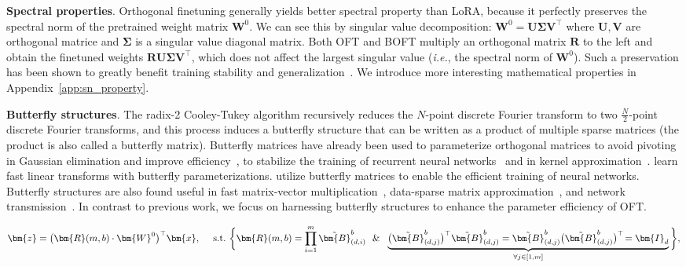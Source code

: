 \textbf{Spectral properties}. Orthogonal finetuning generally yields better spectral property than LoRA, because it perfectly preserves the spectral norm of the pretrained weight matrix $\bm{W}^0$. We can see this by singular value decomposition: $\bm{W}^0=\bm{U}\bm{\Sigma}\bm{V}^\top$ where $\bm{U},\bm{V}$ are orthogonal matrice and $\bm{\Sigma}$ is a singular value diagonal matrix. Both OFT and BOFT multiply an orthogonal matrix $\bm{R}$ to the left and obtain the finetuned weights $\bm{R}\bm{U}\bm{\Sigma}\bm{V}^\top$, which does not affect the largest singular value (\emph{i.e.}, the spectral norm of $\bm{W}^0$). Such a preservation has been shown to greatly benefit training stability and generalization~\cite{miyato2018spectral,yoshida2017spectral}. We introduce more interesting mathematical properties in Appendix~\ref{app:sn_property}.

\textbf{Butterfly structures}. The radix-2 Cooley-Tukey algorithm recursively reduces the $N$-point discrete Fourier transform to two $\frac{N}{2}$-point discrete Fourier transforms, and this process induces a butterfly structure that can be written as a product of multiple sparse matrices (the product is also called a butterfly matrix). Butterfly matrices have already been used to parameterize  orthogonal matrices to avoid pivoting in Gaussian elimination and improve efficiency~\cite{parker1995random}, to stabilize the training of recurrent neural networks~\cite{jing2017tunable} and in kernel approximation~\cite{munkhoeva2018quadrature}. \cite{dao2019learning,dao2019kaleidoscope} learn fast linear transforms with butterfly parameterizations. \cite{chen2022pixelated,dao2022monarch} utilize  butterfly matrices to enable the efficient training of neural networks. Butterfly structures are also found useful in fast matrix-vector multiplication~\cite{michielssen1996multilevel,o2010algorithm}, data-sparse matrix approximation~\cite{li2015butterfly}, and network transmission~\cite{klasing1994broadcasting,li2003linear,rajasingh2016transmission}. In contrast to previous work, we focus on harnessing butterfly structures to enhance the parameter efficiency of OFT.

\begin{equation}
    \begin{aligned}\nonumber
    \bm{z}=\big(\bm{R}(m,b)\cdot\bm{W}^0\big)^\top\bm{x},~~~~\text{s.t.}~\bigg{\{}\bm{R}(m,b)=\prod_{i=1}^m \tilde{\bm{B}}^b_{(d,i)}~~\&~~\underbrace{\big(\tilde{\bm{B}}^b_{(d,j)}\big)^\top\tilde{\bm{B}}^b_{(d,j)}=\tilde{\bm{B}}^b_{(d,j)}\big(\tilde{\bm{B}}^b_{(d,j)}\big)^\top\!=\bm{I}_d}_{\forall j\in [1, m]}\bigg{\}},
    \end{aligned}
\end{equation}


